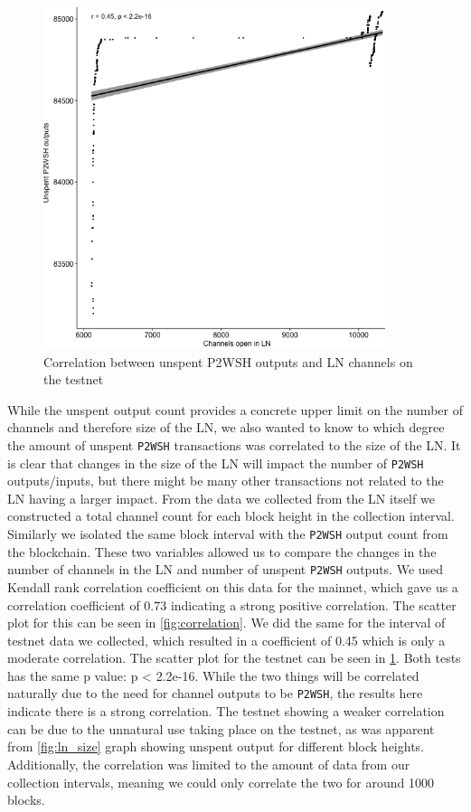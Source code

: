 \begin{figure}[h]
    \centering
    \includegraphics[width=10cm]{figures/graphs/channel_p2wsh_correlation_testnet.png}
    \caption{Correlation between unspent P2WSH outputs and LN channels on the testnet}
    \label{fig:correlation_testnet}
\end{figure}

While the unspent output count provides a concrete upper limit on the number of channels and therefore size of the LN, we also wanted to know to which degree the amount of unspent {\tt P2WSH} transactions was correlated to the size of the LN. It is clear that changes in the size of the LN will impact the number of {\tt P2WSH} outputs/inputs, but there might be many other transactions not related to the LN having a larger impact. From the data we collected from the LN itself we constructed a total channel count for each block height in the collection interval. Similarly we isolated the same block interval with the {\tt P2WSH} output count from the blockchain. These two variables allowed us to compare the changes in the number of channels in the LN and number of unspent {\tt P2WSH} outputs. We used Kendall rank correlation coefficient on this data for the mainnet, which gave us a correlation coefficient of 0.73 indicating a strong positive correlation. The scatter plot for this can be seen in \cref{fig:correlation}.
We did the same for the interval of testnet data we collected, which resulted in a coefficient of 0.45 which is only a moderate correlation. 
The scatter plot for the testnet can be seen in \cref{fig:correlation_testnet}.
Both tests has the same p value: p < 2.2e-16. 
While the two things will be correlated naturally due to the need for channel outputs to be {\tt P2WSH}, the results here indicate there is a strong correlation. The testnet showing a weaker correlation can be due to the unnatural use taking place on the testnet, as was apparent from \cref{fig:ln_size} graph showing unspent output for different block heights. Additionally, the correlation was limited to the amount of data from our collection intervals, meaning we could only correlate the two for around 1000 blocks.

